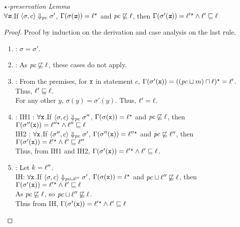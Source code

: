 \begin{myLemma}{\emph{$\star$-preservation Lemma}}\\
\label{lem:app:gpua:sup1}
$\forall \emph{\texttt{x}}$.If $\langle \sigma, c \rangle \Downarrow_{\mathit{pc}}
\sigma'$, $\Gamma(\sigma(\emph{\texttt{x}})) =   \ell {}^\star
 $ and $\mathit{pc} \not\sqsubseteq \ell$, then $\Gamma(\sigma'(\emph{\texttt{x}})) =
  \ell' {}^\star   \wedge \ell' \sqsubseteq \ell$
\end{myLemma}
\begin{proof}
Proof by induction on the derivation and case analysis on the last
rule.

\begin{enumerate}
\item {} : $\sigma = \sigma'$.

\item {}: As $\mathit{pc} \not\sqsubseteq \ell$, these cases do not apply.

\item {}: From the premises, for $\texttt{x}$ in statement $c$,
  $\Gamma(\sigma'(\texttt{x})) =   ((\mathit{pc} \sqcup m)
  \sqcap \ell) {}^\star  =  \ell'$. Thus, $\ell' \sqsubseteq \ell$.\\
  For any other $y$, $\sigma(y) = \sigma'(y)$. Thus, $\ell' = \ell$.

\item {} : IH1 : $\forall \texttt{x}$.If $ \langle \sigma, c \rangle \Downarrow_{\mathit{pc}}
\sigma''$, $\Gamma(\sigma(\texttt{x})) =   \ell{}^\star
 $ and $\mathit{pc} \not\sqsubseteq \ell$, then $\Gamma(\sigma''(\texttt{x})) =
  \ell'' {}^\star   \wedge \ell'' \sqsubseteq \ell$\\
IH2 : $\forall \texttt{x}$.If $ \langle \sigma'', c \rangle \Downarrow_{\mathit{pc}}
\sigma'$, $\Gamma(\sigma''(\texttt{x})) =   \ell'' {}^\star
 $ and $\mathit{pc} \not\sqsubseteq \ell''$, then $\Gamma(\sigma'(\texttt{x})) =
  \ell' {}^\star   \wedge \ell' \sqsubseteq \ell''$\\
Thus, from IH1 and IH2, $\Gamma(\sigma'(\texttt{x})) =
  \ell' {}^\star   \wedge \ell' \sqsubseteq \ell$.

\item {}: Let $k = \ell''$. \\
 IH: $\forall \texttt{x}$.If $ \langle \sigma, c \rangle \Downarrow_{\mathit{pc} \sqcup \ell''}
\sigma'$, $\Gamma(\sigma(\texttt{x})) =   \ell {}^\star
 $ and $\mathit{pc} \sqcup \ell'' \not\sqsubseteq \ell$, then $\Gamma(\sigma'(\texttt{x})) =
  \ell' {}^\star   \wedge \ell' \sqsubseteq \ell$\\
 As $\mathit{pc} \not\sqsubseteq \ell$, so $\mathit{pc} \sqcup \ell'' \not\sqsubseteq
 \ell$. \\ Thus from IH, $\Gamma(\sigma'(\texttt{x})) =
  \ell' {}^\star   \wedge \ell' \sqsubseteq \ell$


\end{enumerate}
\end{proof}
